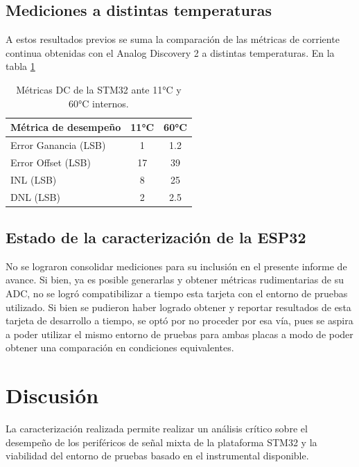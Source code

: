 \documentclass{article}
\begin{document}
\subsection{Mediciones a distintas temperaturas}
A estos resultados previos se suma la comparación de las métricas de corriente continua obtenidas con el Analog Discovery 2 a distintas temperaturas. En la tabla \ref{tab:dc adc temp}
\begin{table}[h]
    \centering
    \begin{tabular}{|l|c|c|}
        \hline
        \textbf{Métrica de desempeño} & \textbf{11°C} & \textbf{60°C} \\ \hline
        Error Ganancia (LSB)& 1         & 1.2 \\ \hline
        Error Offset (LSB)  & 17        & 39   \\ \hline
        INL (LSB)           & 8         & 25   \\ \hline
        DNL (LSB)           & 2         & 2.5 \\ \hline
    \end{tabular}
    \caption{Métricas DC de la STM32 ante 11°C y 60°C internos.}
    \label{tab:dc adc temp}
\end{table}
\subsection{Estado de la caracterización de la ESP32}
No se lograron consolidar mediciones para su inclusión en el presente informe de avance. Si bien, ya es posible generarlas y obtener métricas rudimentarias de su ADC, no se logró compatibilizar a tiempo esta tarjeta con el entorno de pruebas utilizado. Si bien se pudieron haber logrado obtener y reportar resultados de esta tarjeta de desarrollo a tiempo, se optó por no proceder por esa vía, pues se aspira a poder utilizar el mismo entorno de pruebas para ambas placas a modo de poder obtener una comparación en condiciones equivalentes.
\section{Discusión}
La caracterización realizada permite realizar un análisis crítico sobre el desempeño de los periféricos de señal mixta de la plataforma STM32 y la viabilidad del entorno de pruebas basado en el instrumental disponible.
\end{document}
